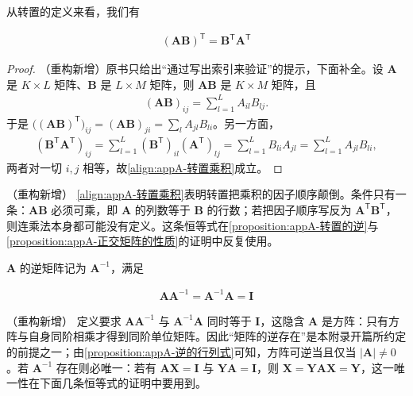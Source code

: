 \documentclass[../main.tex]{subfiles}
\begin{document}
从转置的定义来看，我们有
\begin{proposition}[乘积的转置]\label{proposition:appA-乘积的转置}
\begin{align}
  (\bm{A}\bm{B})^{\mathsf{T}}=\bm{B}^{\mathsf{T}}\bm{A}^{\mathsf{T}}
  \label{align:appA-转置乘积}
\end{align}
\end{proposition}

\begin{proof}
（重构新增）原书只给出“通过写出索引来验证”的提示，下面补全。设 $\bm{A}$ 是 $K\times L$ 矩阵、$\bm{B}$ 是 $L\times M$ 矩阵，则 $\bm{A}\bm{B}$ 是 $K\times M$ 矩阵，且
\begin{align*}
  (\bm{A}\bm{B})_{ij}=\sum_{l=1}^{L}A_{il}B_{lj}.
\end{align*}
于是 $\bigl((\bm{A}\bm{B})^{\mathsf{T}}\bigr)_{ij}=(\bm{A}\bm{B})_{ji}=\sum_{l}A_{jl}B_{li}$。另一方面，
\begin{align*}
  (\bm{B}^{\mathsf{T}}\bm{A}^{\mathsf{T}})_{ij}=\sum_{l=1}^{L}(\bm{B}^{\mathsf{T}})_{il}(\bm{A}^{\mathsf{T}})_{lj}=\sum_{l=1}^{L}B_{li}A_{jl}=\sum_{l=1}^{L}A_{jl}B_{li},
\end{align*}
两者对一切 $i,j$ 相等，故\eqref{align:appA-转置乘积}成立。
\end{proof}

\begin{remark}（重构新增）
\eqref{align:appA-转置乘积}表明转置把乘积的因子顺序颠倒。条件只有一条：$\bm{A}\bm{B}$ 必须可乘，即 $\bm{A}$ 的列数等于 $\bm{B}$ 的行数；若把因子顺序写反为 $\bm{A}^{\mathsf{T}}\bm{B}^{\mathsf{T}}$，则连乘法本身都可能没有定义。这条恒等式在\cref{proposition:appA-转置的逆}与\cref{proposition:appA-正交矩阵的性质}的证明中反复使用。
\end{remark}

$\bm{A}$ 的逆矩阵记为 $\bm{A}^{-1}$，满足
\begin{definition}[逆矩阵]\label{definition:appA-逆矩阵}
\begin{align}
  \bm{A}\bm{A}^{-1}=\bm{A}^{-1}\bm{A}=\bm{I}
  \label{align:appA-逆定义}
\end{align}
\end{definition}

\begin{remark}（重构新增）
定义要求 $\bm{A}\bm{A}^{-1}$ 与 $\bm{A}^{-1}\bm{A}$ 同时等于 $\bm{I}$，这隐含 $\bm{A}$ 是方阵：只有方阵与自身同阶相乘才得到同阶单位矩阵。因此“矩阵的逆存在”是本附录开篇所约定的前提之一；由\cref{proposition:appA-逆的行列式}可知，方阵可逆当且仅当 $|\bm{A}|\neq0$。若 $\bm{A}^{-1}$ 存在则必唯一：若有 $\bm{A}\bm{X}=\bm{I}$ 与 $\bm{Y}\bm{A}=\bm{I}$，则 $\bm{X}=\bm{Y}\bm{A}\bm{X}=\bm{Y}$，这一唯一性在下面几条恒等式的证明中要用到。
\end{remark}
\end{document}
